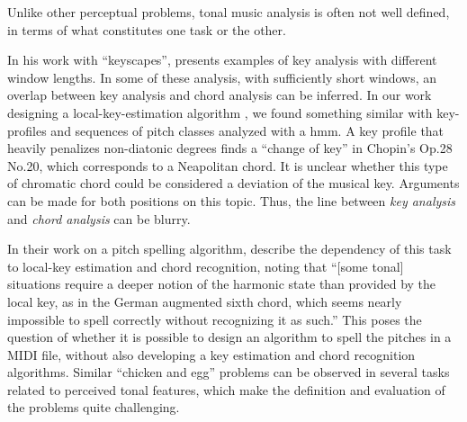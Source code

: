 

Unlike other perceptual problems, tonal music analysis is
often not well defined, in terms of what constitutes one
task or the other.


In his work with ``keyscapes'',
\textcite{sapp2011computational} presents examples of key
analysis with different window lengths. In some of these
analysis, with sufficiently short windows, an overlap
between key analysis and chord analysis can be inferred. In
our work designing a local-key-estimation algorithm
\parencite{napoleslopez2019keyfinding}, we found something
similar with key-profiles and sequences of pitch classes
analyzed with a \gls{hmm}. A key profile that heavily
penalizes non-diatonic degrees finds a ``change of key'' in
Chopin's Op.28 No.20, which corresponds to a Neapolitan
chord. It is unclear whether this type of chromatic chord
could be considered a deviation of the musical key.
Arguments can be made for both positions on this topic.
Thus, the line between \emph{key analysis} and \emph{chord
analysis} can be blurry.


In their work on a pitch spelling algorithm,
\textcite{teodoru2007pitch} describe the dependency of this
task to local-key estimation and chord recognition, noting
that ``[some tonal] situations require a deeper notion of
the harmonic state than provided by the local key, as in the
German augmented sixth chord, which seems nearly impossible
to spell correctly without recognizing it as such.'' This
poses the question of whether it is possible to design an
algorithm to spell the pitches in a \gls{MIDI} file, without
also developing a key estimation and chord recognition
algorithms. Similar ``chicken and egg'' problems can be
observed in several tasks related to perceived tonal
features, which make the definition and evaluation of the
problems quite challenging.
